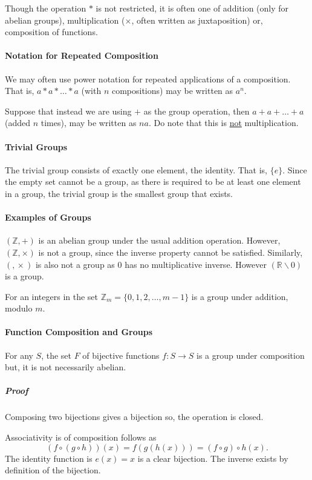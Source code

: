 Though the operation \(*\) is not restricted, it is often one of addition
(only for abelian groups),
multiplication (\(\times\), often written as juxtaposition) or,
composition of functions.

\paragraph{Notation for Repeated Composition}
We may often use power notation for repeated applications of a composition.
That is, \(a*a*\dots*a\) (with \(n\) compositions) may be written as \(a^n.\)

Suppose that instead we are using \(+\) as the group operation, then
\(a+a+\dots+a\) (added \(n\) times), may be written as
\(na\). Do note that this is \underline{not} multiplication.

\paragraph{Trivial Groups}
The trivial group consists of exactly one element, the identity.
That is, \(\{e\}\).
Since the empty set cannot be a group, as there is required to be at least
one element in a group, the trivial group is the smallest group that exists.


\paragraph{Examples of Groups}
\((\mathbb{Z}, +)\) is an abelian group under the usual addition operation.
However, \((\mathbb{Z}, \times)\) is not a group, since the inverse property
cannot be satisfied.
Similarly, \((\mathbb, \times)\) is also not a group as \(0\) has no multiplicative
inverse. However \((\mathbb{R}\backslash 0)\) is a group.

For an integers in the set \(\mathbb{Z}_m = \{0, 1, 2,\dots, m-1\}\)
is a group under addition, modulo \(m\).

\paragraph{Function Composition and Groups}
For any \(S\), the set \(F\) of bijective functions
\(f: S\to S\) is a group under composition but,
it is not necessarily abelian.

    \subparagraph{Proof}
    Composing two bijections gives a bijection so, the operation is closed.

    Associativity is of composition follows as
    \[
        (f\circ (g\circ h))(x) = f(g(h(x))) = (f\circ g)\circ h(x).
    \]
    The identity function is \(e(x) = x\) is a clear bijection.
    The inverse exists by definition of the bijection.

